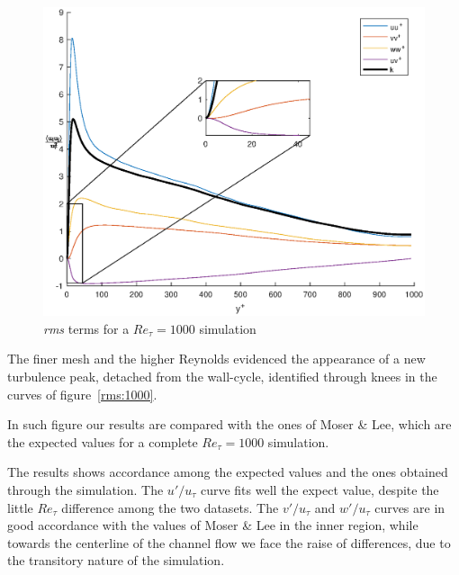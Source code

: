 \begin{figure}
\begin{center}
\includegraphics[scale=0.55]{grafici/budget+k_1000.eps}
\caption{\emph{rms} terms for a $Re_{\tau}=1000$ simulation}
\label{budget:1000}
\end{center} 
\end{figure}


The finer mesh and the higher Reynolds evidenced the appearance of a new turbulence peak, detached from the wall-cycle, identified through knees in the curves of figure~\ref{rms:1000}. \par
In such figure our results are compared with the ones of Moser \& Lee, which are the expected values for a complete $Re_{\tau}=1000$ simulation. \par
The results shows accordance among the expected values and the ones obtained through the simulation.
The $u'/u_{\tau}$ curve fits well the expect value, despite the little $Re_{\tau}$ difference among the two datasets.
The $v'/u_{\tau}$ and $w'/u_{\tau}$ curves are in good accordance with the values of Moser \& Lee in the inner region, while towards the centerline of the channel flow we face the raise of differences, due to the transitory nature of the simulation.\\~\par



